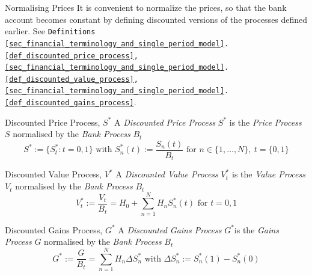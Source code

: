 \documentclass[11pt,a4paper]{article}
\begin{document}
  \begin{remark}{Normalising Prices}
    It is convenient to normalize the prices, so that the bank account becomes constant by defining discounted versions of the processes defined earlier. See \texttt{Definitions \ref{sec_financial_terminology_and_single_period_model}.\ref{def_discounted_price_process}, \ref{sec_financial_terminology_and_single_period_model}.\ref{def_discounted_value_process}, \ref{sec_financial_terminology_and_single_period_model}.\ref{def_discounted_gains_process}}.
  \end{remark}

  \begin{definition}{Discounted Price Process, $S^*$}\label{def_discounted_price_process}
    A \textit{Discounted Price Process} $S^*$ is the \textit{Price Process} $S$ normalised by the \textit{Bank Process} $B_t$
    \[S^*:=\{S_t^*:t=0,1\}\text{ with }S_n^*(t):=\frac{S_n(t)}{B_t}\text{ for }n\in\{1,\dots,N\},\ t=\{0,1\}\]
  \end{definition}

  \begin{definition}{Discounted Value Process, $V^*$}\label{def_discounted_value_process}
    A \textit{Discounted Value Process} $V_t^*$ is the \textit{Value Process} $V_t$ normalised by the \textit{Bank Process} $B_t$
    \[ V_t^*:=\frac{V_t}{B_t}=H_0+\sum_{n=1}^NH_nS_n^*(t)\text{ for }t=0,1 \]
  \end{definition}

  \begin{definition}{Discounted Gains Process, $G^*$}\label{def_discounted_gains_process}
    A \textit{Discounted Gains Process} $G^*$is the \textit{Gains Process} $G$ normalised by the \textit{Bank Process} $B_t$
    \[ G^*:=\frac{G}{B_t}=\sum_{n=1}^NH_n\Delta S_n^*\text{ with }\Delta S_n^*:=S_n^*(1)-S_n^*(0) \]
  \end{definition}
\end{document}
